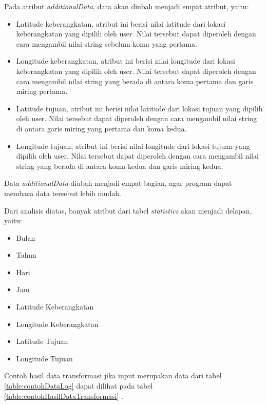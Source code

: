 Pada atribut \textsl{additionalData}, data akan diubah menjadi empat atribut, yaitu:
\begin{itemize}
	\item Latitude keberangkatan, atribut ini berisi nilai latitude dari lokasi keberangkatan yang dipilih oleh user. Nilai tersebut dapat diperoleh dengan cara mengambil nilai string sebelum koma yang pertama.
	\item Longitude keberangkatan, atribut ini berisi nilai longitude dari lokasi keberangkatan yang dipilih oleh user. Nilai tersebut dapat diperoleh dengan cara mengambil nilai string yang berada di antara koma pertama dan garis miring pertama.
	\item Latitude tujuan, atribut ini berisi nilai latitude dari lokasi tujuan yang dipilih oleh user. Nilai tersebut dapat diperoleh dengan cara mengambil nilai string di antara garis miring yang pertama dan koma kedua.
	\item Longitude tujuan, atribut ini berisi nilai longitude dari lokasi tujuan yang dipilih oleh user. Nilai tersebut dapat diperoleh dengan cara mengambil nilai string yang berada di antara koma kedua dan garis miring kedua.
\end{itemize}

Data \textsl{additionalData} diubah menjadi empat bagian, agar program dapat membaca data tersebut lebih mudah.

Dari analisis diatas, banyak atribut dari tabel \textsl{statistics} akan menjadi delapan, yaitu:
\begin{itemize}
	\item Bulan
	\item Tahun
	\item Hari
	\item Jam
	\item Latitude Keberangkatan
	\item Longitude Keberangkatan
	\item Latitude Tujuan
	\item Longitude Tujuan
\end{itemize}

Contoh hasil data transformasi jika input merupakan data dari tabel \ref{table:contohDataLog} dapat dilihat pada tabel \ref{table:contohHasilDataTransformasi}	.


